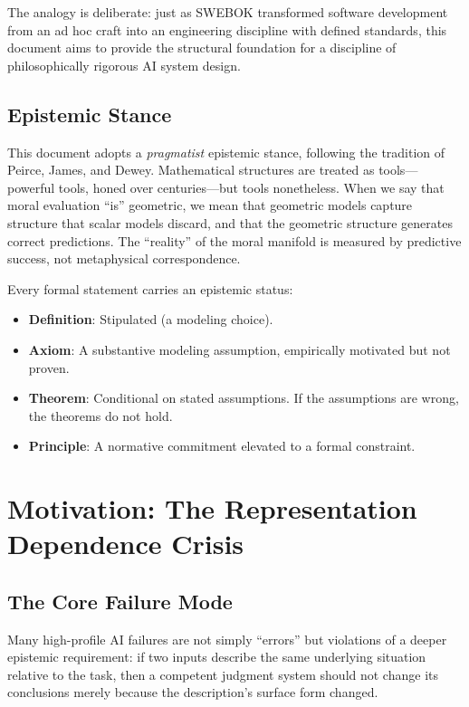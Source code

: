 \documentclass[12pt,letterpaper]{article}
\theoremstyle{definition}
\theoremstyle{plain}
\begin{document}
The analogy is deliberate: just as SWEBOK transformed software development from an ad hoc craft into an engineering discipline with defined standards, this document aims to provide the structural foundation for a discipline of philosophically rigorous AI system design.

\subsection{Epistemic Stance}

This document adopts a \emph{pragmatist} epistemic stance, following the tradition of Peirce, James, and Dewey. Mathematical structures are treated as tools---powerful tools, honed over centuries---but tools nonetheless. When we say that moral evaluation ``is'' geometric, we mean that geometric models capture structure that scalar models discard, and that the geometric structure generates correct predictions. The ``reality'' of the moral manifold is measured by predictive success, not metaphysical correspondence.

Every formal statement carries an epistemic status:
\begin{itemize}
    \item \textbf{Definition}: Stipulated (a modeling choice).
    \item \textbf{Axiom}: A substantive modeling assumption, empirically motivated but not proven.
    \item \textbf{Theorem}: Conditional on stated assumptions. If the assumptions are wrong, the theorems do not hold.
    \item \textbf{Principle}: A normative commitment elevated to a formal constraint.
\end{itemize}


\section{Motivation: The Representation Dependence Crisis}
\label{sec:motivation}

\subsection{The Core Failure Mode}

Many high-profile AI failures are not simply ``errors'' but violations of a deeper epistemic requirement: if two inputs describe the same underlying situation relative to the task, then a competent judgment system should not change its conclusions merely because the description's surface form changed.
\end{document}

